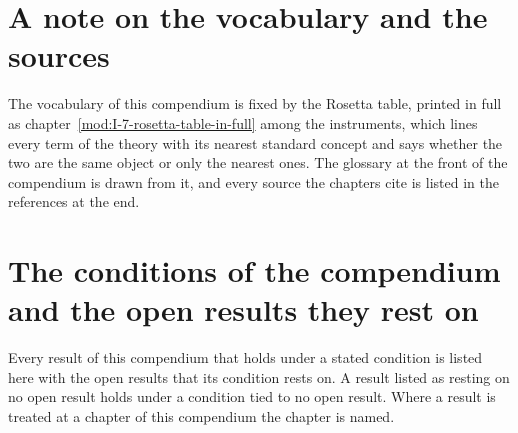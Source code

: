 \appendix
\section{A note on the vocabulary and the sources}\label{app:dictionarynote}
The vocabulary of this compendium is fixed by the Rosetta table, printed in full as chapter~\ref{mod:I-7-rosetta-table-in-full} among the instruments, which lines every term of the theory with its nearest standard concept and says whether the two are the same object or only the nearest ones. The glossary at the front of the compendium is drawn from it, and every source the chapters cite is listed in the references at the end.
\section{The conditions of the compendium and the open results they rest on}\label{app:conditions}
Every result of this compendium that holds under a stated condition is listed here with the open results that its condition rests on. A result listed as resting on no open result holds under a condition tied to no open result. Where a result is treated at a chapter of this compendium the chapter is named.
